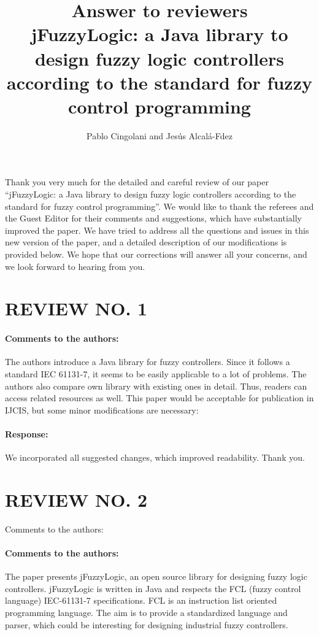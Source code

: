 \documentclass[10pt,a4paper]{article}
\begin{document}
\title{Answer to reviewers \\
jFuzzyLogic: a Java library to design fuzzy logic controllers according to the standard for fuzzy control programming
}
\author{Pablo Cingolani and Jes\'us Alcal\'a-Fdez}

\date{}
\maketitle

Thank you very much for the detailed and careful review of our paper ``jFuzzyLogic: a Java library to design fuzzy logic controllers according to the standard for fuzzy control programming''. 
We would like to thank the referees and the Guest Editor for their comments and suggestions, which have substantially improved the paper. 
We have tried to address all the questions and issues in this new version of the paper, and a detailed description of our modifications is provided below. 
We hope that our corrections will answer all your concerns, and we look forward to hearing from you.

\section{REVIEW NO. 1}

\paragraph{Comments to the authors:} The authors introduce a Java library for fuzzy controllers. 
Since it follows a standard IEC 61131-7, it seems to be easily applicable to a lot of problems. 
The authors also compare own library with existing ones in detail. 
Thus, readers can access related resources as well. 
This paper would be acceptable for publication in IJCIS, but some minor modifications are necessary:

\paragraph{Response:} We incorporated all suggested changes, which improved readability. 
Thank you.

\section{REVIEW NO. 2}

Comments to the authors:

\paragraph{Comments to the authors:} The paper presents jFuzzyLogic, an open source library for designing fuzzy logic controllers. 
jFuzzyLogic is written in Java and respects the FCL (fuzzy control language) IEC-61131-7 specifications. 
FCL is an instruction list oriented programming language. 
The aim is to provide a standardized language and parser, which could be interesting for designing industrial fuzzy controllers. 
\end{document}
